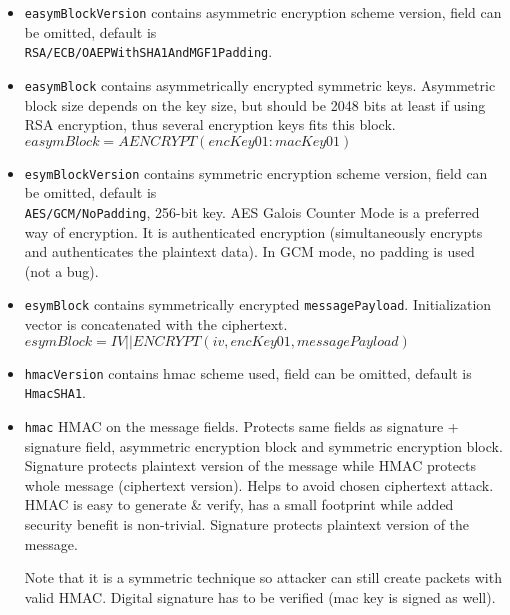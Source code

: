 \documentclass[a4paper,10pt]{article}
\begin{document}
\begin{itemize}
$
sig = SIGN_{privKey}(hash(protocolType:protocolVersion:ampType:ampVersion:sequenceNumber:randomNonce:sender:
destination:destinationType:iv:encKey01:macKey01:messagePayload)) 
$

\item \verb#easymBlockVersion# contains asymmetric encryption scheme version, field can be omitted, default is \\\verb#RSA/ECB/OAEPWithSHA1AndMGF1Padding#.
\item \verb#easymBlock# contains asymmetrically encrypted symmetric keys. Asymmetric block size depends on the key size, but should be 2048 bits
at least if using RSA encryption, thus several encryption keys fits this block.\\
$easymBlock = AENCRYPT(encKey01:macKey01)$

\item \verb#esymBlockVersion# contains symmetric encryption scheme version, field can be omitted, default is \\\verb#AES/GCM/NoPadding#, 256-bit key.
AES Galois Counter Mode is a preferred way of encryption. 
It is authenticated encryption (simultaneously encrypts and authenticates the plaintext data). In GCM mode, no padding is used (not a bug).

\item \verb#esymBlock# contains symmetrically encrypted \verb#messagePayload#. Initialization vector is concatenated with the ciphertext.\\
$esymBlock = IV || ENCRYPT(iv, encKey01, messagePayload)$

\item \verb#hmacVersion# contains hmac scheme used, field can be omitted, default is \verb#HmacSHA1#.

\item \verb#hmac# HMAC on the message fields. Protects same fields as signature + signature field, 
asymmetric encryption block and symmetric encryption block. Signature protects plaintext version of the message 
while HMAC protects whole message (ciphertext version). Helps to avoid chosen ciphertext attack. 
HMAC is easy to generate \& verify, has a small footprint while added security benefit is non-trivial.
Signature protects plaintext version of the message.

Note that it is a symmetric technique so attacker can still create packets with valid HMAC. Digital signature 
has to be verified (mac key is signed as well).


\end{itemize}
\end{document}
